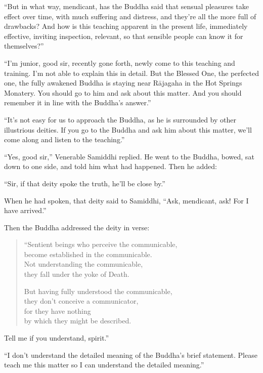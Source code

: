 \documentclass[12pt,openany]{book}%
\begin{document}
“But in what way, mendicant, has the Buddha said that sensual pleasures take effect over time, with much suffering and distress, and they’re all the more full of drawbacks? And how is this teaching apparent in the present life, immediately effective, inviting inspection, relevant, so that sensible people can know it for themselves?” 

“I’m junior, good sir, recently gone forth, newly come to this teaching and training. I’m not able to explain this in detail. But the Blessed One, the perfected one, the fully awakened Buddha is staying near \textsanskrit{Rājagaha} in the Hot Springs Monatery. You should go to him and ask about this matter. And you should remember it in line with the Buddha’s answer.” 

“It’s not easy for us to approach the Buddha, as he is surrounded by other illustrious deities. If you go to the Buddha and ask him about this matter, we’ll come along and listen to the teaching.” 

“Yes, good sir,” Venerable Samiddhi replied. He went to the Buddha, bowed, sat down to one side, and told him what had happened. Then he added: 

“Sir, if that deity spoke the truth, he’ll be close by.” 

When he had spoken, that deity said to Samiddhi, “Ask, mendicant, ask! For I have arrived.” 

Then the Buddha addressed the deity in verse: 

\begin{verse}%
“Sentient beings who perceive the communicable, \\
become established in the communicable. \\
Not understanding the communicable, \\
they fall under the yoke of Death. 

But having fully understood the communicable, \\
they don’t conceive a communicator, \\
for they have nothing \\
by which they might be described. 

%
\end{verse}

Tell me if you understand, spirit.” 

“I don’t understand the detailed meaning of the Buddha’s brief statement. Please teach me this matter so I can understand the detailed meaning.” 
\end{document}
